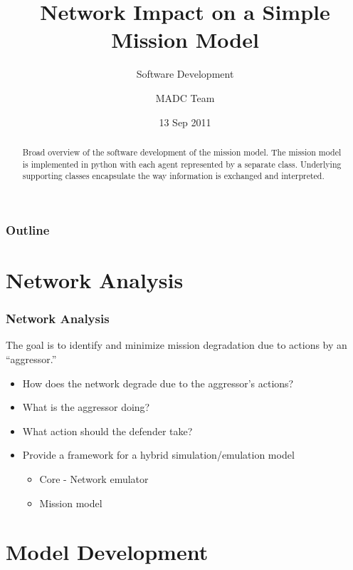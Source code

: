\documentclass{beamer}
\begin{document}
\title{Network Impact on a Simple Mission Model}
\subtitle{Software Development}
\author{MADC Team}
\date{13 Sep 2011}

\begin{frame}
  \titlepage
  \begin{abstract}
    Broad overview of the software development of the mission
    model. The mission model is implemented in python with each agent
    represented by a separate class. Underlying supporting classes
    encapsulate the way information is exchanged and interpreted.
  \end{abstract}
\end{frame}



\begin{frame}
  \frametitle{Outline}
\end{frame}


\section{Network Analysis}

\begin{frame}
  \frametitle{Network Analysis}
  
  The goal is to identify and minimize mission degradation due to
  actions by an ``aggressor.''  

  \begin{itemize}
  \item How does the network degrade due to the aggressor's actions?
  \item What is the aggressor doing?
  \item What action should the defender take?
  \item Provide a framework for a hybrid simulation/emulation model
    \begin{itemize}
    \item Core - Network emulator
    \item Mission model 
    \end{itemize}
  \end{itemize}

\end{frame}




\section{Model Development}
\end{document}

